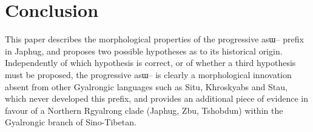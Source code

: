 \documentclass[oldfontcommands,oneside,a4paper,11pt]{article}
\newcommand{\ipa}[1]{{\phon \mbox{#1}}} %
\begin{document}
\section{Conclusion}
This paper describes the morphological properties of the progressive \ipa{asɯ--} prefix in Japhug, and proposes two possible hypotheses as to its historical origin. Independently of which hypothesis is correct, or of whether a third hypothesis must be proposed, the progressive \ipa{asɯ--} is clearly a morphological innovation absent from other Gyalrongic languages such as Situ,  Khroskyabs and Stau, which never developed this prefix, and provides an additional piece of evidence in favour of a Northern Rgyalrong clade (Japhug, Zbu, Tshobdun) within the Gyalrongic branch of Sino-Tibetan.




\end{document}
